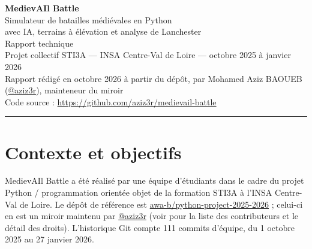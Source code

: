 \documentclass[11pt,a4paper]{article}
\newcommand{\code}[1]{\texttt{\detokenize{#1}}}
\begin{document}
\begin{center}
{\Huge\bfseries\color{accent} MedievAIl Battle}\\[6pt]
{\Large Simulateur de batailles m\'edi\'evales en Python\\[2pt] avec IA, terrains \`a \'el\'evation et analyse de Lanchester}\\[10pt]
{\large Rapport technique}\\[10pt]
{\small Projet collectif STI3A --- INSA Centre-Val de Loire --- octobre 2025 \`a janvier 2026\\
Rapport r\'edig\'e en octobre 2026 \`a partir du d\'ep\^ot, par Mohamed Aziz BAOUEB (\href{https://github.com/aziz3r}{@aziz3r}), mainteneur du miroir\\[2pt]
Code source : \url{https://github.com/aziz3r/medievail-battle}}
\end{center}
\vspace{-2pt}
\noindent\rule{\linewidth}{0.8pt}

\begin{abstract}\noindent
MedievAIl Battle est un jeu de bataille strat\'egique en Python (pygame) o\`u deux arm\'ees d'unit\'es m\'edi\'evales
--- piquiers, chevaliers, arbal\'etriers et, dans un mode particulier, une merveille \`a d\'efendre --- s'affrontent
sur une carte \`a \'el\'evation, pilot\'ees chacune par une intelligence artificielle. Ce document pr\'esente
l'architecture du code, les r\`egles du mod\`ele de combat, les cinq IA livr\'ees, les interfaces (menu, vue isom\'etrique 2.5D,
vue terminal, ligne de commande) et les outils d'analyse (tournois, loi carr\'ee de Lanchester). Il s'appuie
sur des mesures effectu\'ees pour l'occasion --- un tournoi de 500 matchs et des chronom\'etrages --- et signale
les limites rep\'er\'ees dans le code. Le projet est une \oe uvre collective : le d\'ep\^ot est un miroir et
l'historique Git d'origine est conserv\'e.
\end{abstract}

\setcounter{tocdepth}{1}
\tableofcontents

\section{Contexte et objectifs}

MedievAIl Battle a \'et\'e r\'ealis\'e par une \'equipe d'\'etudiants dans le cadre du projet Python / programmation
orient\'ee objet de la formation STI3A \`a l'INSA Centre-Val de Loire. Le d\'ep\^ot de r\'ef\'erence est
\href{https://github.com/awa-b/python-project-2025-2026}{awa-b/python-project-2025-2026} ; celui-ci en est un miroir
maintenu par \href{https://github.com/aziz3r}{@aziz3r} (voir \code{AUTHORS.md} pour la liste des contributeurs
et le d\'etail des droits). L'historique Git compte 111 commits d'\'equipe, du 1\ier{} octobre 2025 au 27 janvier 2026.
\end{document}

